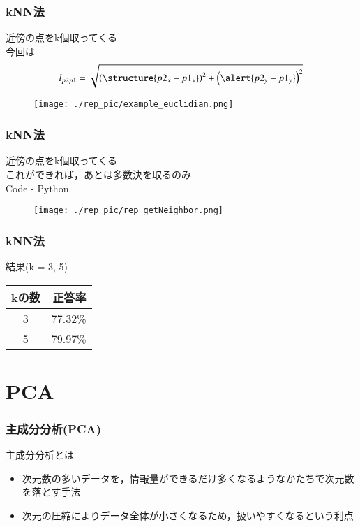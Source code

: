 \documentclass[dvipdfmx]{beamer}
\begin{document}
\begin{frame}
  \frametitle{kNN法}
  近傍の点をk個取ってくる \\
  今回は
  \begin{equation}
    l_{p2p1} = \sqrt{\left( \structure{p2_{x} - p1_{x}} \right)^{2} + \left( \alert{p2_{y} - p1_{y}} \right)^{2}}
  \end{equation}
  \begin{figure}
    \texttt{[image: ./rep\_pic/example\_euclidian.png]}
  \end{figure}
\end{frame}

\begin{frame}
  \frametitle{kNN法}
  近傍の点をk個取ってくる \\
  これができれば，あとは多数決を取るのみ \\
  Code - Python
  \begin{figure}
    \texttt{[image: ./rep\_pic/rep\_getNeighbor.png]}
  \end{figure}
\end{frame}

\begin{frame}
  \frametitle{kNN法}
  結果(k = 3, 5)
  \begin{center}
  \begin{table}
    \begin{tabular}{ c r } \toprule
      kの数 & 正答率 \\ \midrule
      3 & 77.32\% \\
      5 & 79.97\% \\ \bottomrule
    \end{tabular}
  \end{table}
  \end{center}
\end{frame}

\section{PCA}
\begin{frame}
  \frametitle{主成分分析(PCA)}
  主成分分析とは
  \begin{itemize}
    \item 次元数の多いデータを，情報量ができるだけ多くなるようなかたちで次元数を落とす手法
    \item 次元の圧縮によりデータ全体が小さくなるため，扱いやすくなるという利点
  \end{itemize}
\end{frame}
\end{document}
